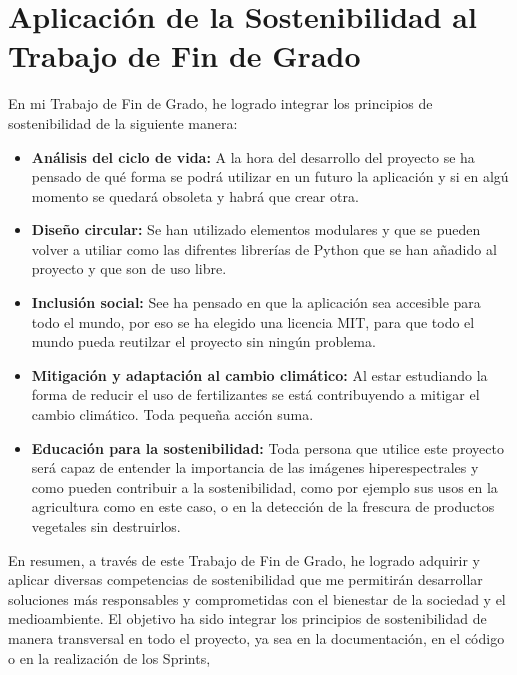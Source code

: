 \section{Aplicación de la Sostenibilidad al Trabajo de Fin de Grado}
En mi Trabajo de Fin de Grado, he logrado integrar los principios de sostenibilidad de la siguiente manera:
\begin{itemize}
    \item \textbf{Análisis del ciclo de vida:} A la hora del desarrollo del proyecto se ha pensado de qué forma se podrá utilizar en un futuro la aplicación y si en algú momento se quedará obsoleta y habrá que crear otra.
    \item \textbf{Diseño circular:} Se han utilizado elementos modulares y que se pueden volver a utiliar como las difrentes librerías de Python que se han añadido al proyecto y que son de uso libre.
    \item \textbf{Inclusión social:} See ha pensado en que la aplicación sea accesible para todo el mundo, por eso se ha elegido una licencia MIT, para que todo el mundo pueda reutilzar el proyecto sin ningún problema.
    \item \textbf{Mitigación y adaptación al cambio climático:} Al estar estudiando la forma de reducir el uso de fertilizantes se está contribuyendo a mitigar el cambio climático. Toda pequeña acción suma.
    \item \textbf{Educación para la sostenibilidad:} Toda persona que utilice este proyecto será capaz de entender la importancia de las imágenes hiperespectrales y como pueden contribuir a la sostenibilidad, como por ejemplo sus usos en la agricultura como en este caso, o en la detección de la frescura de productos vegetales sin destruirlos.
\end{itemize}


En resumen, a través de este Trabajo de Fin de Grado, he logrado adquirir y aplicar diversas competencias de sostenibilidad que me permitirán desarrollar soluciones más responsables y comprometidas con el bienestar de la sociedad y el medioambiente. El objetivo ha sido integrar los principios de sostenibilidad de manera transversal en todo el proyecto, ya sea en la documentación, en el código o en la realización de los Sprints,